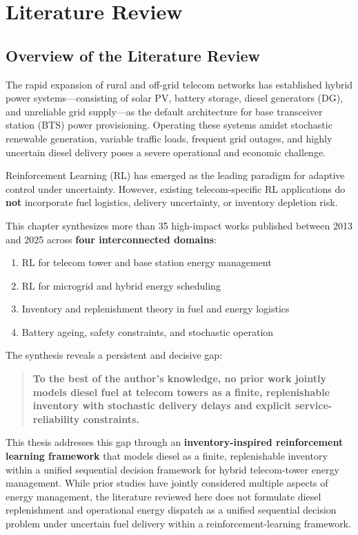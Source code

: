 \chapter{Literature Review}
\label{chap:literature}

\section{Overview of the Literature Review}

The rapid expansion of rural and off-grid telecom networks has established hybrid power systems—consisting of solar PV, battery storage, diesel generators (DG), and unreliable grid supply—as the default architecture for base transceiver station (BTS) power provisioning. Operating these systems amidst stochastic renewable generation, variable traffic loads, frequent grid outages, and highly uncertain diesel delivery poses a severe operational and economic challenge.

Reinforcement Learning (RL) has emerged as the leading paradigm for adaptive control under uncertainty. However, existing telecom-specific RL applications do \textbf{not} incorporate fuel logistics, delivery uncertainty, or inventory depletion risk.

This chapter synthesizes more than 35 high-impact works published between 2013 and 2025 across \textbf{four interconnected domains}:

\begin{enumerate}
    \item RL for telecom tower and base station energy management
    \item RL for microgrid and hybrid energy scheduling
    \item Inventory and replenishment theory in fuel and energy logistics
    \item Battery ageing, safety constraints, and stochastic operation
\end{enumerate}

The synthesis reveals a persistent and decisive gap:

\begin{quote}
\textbf{To the best of the author's knowledge, no prior work
jointly models diesel fuel at telecom towers as a finite,
replenishable inventory with stochastic delivery delays
and explicit service-reliability constraints.}
\end{quote}

This thesis addresses this gap through an \textbf{inventory-inspired
reinforcement learning framework} that models diesel as a finite,
replenishable inventory within a unified sequential decision framework
for hybrid telecom-tower energy management. While prior studies have
jointly considered multiple aspects of energy management, the literature
reviewed here does not formulate diesel replenishment and operational
energy dispatch as a unified sequential decision problem under uncertain
fuel delivery within a reinforcement-learning framework.

